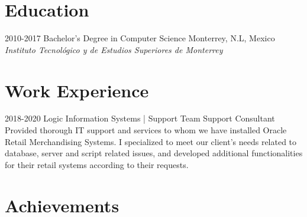 \documentclass[]{twentysecondcv}
\begin{document}
\section{Education}

\begin{twenty}
  \twentyitem
    {2010-2017}
    {Bachelor's Degree {\normalfont in Computer Science}}
    {Monterrey, N.L, Mexico}
    {\emph{Instituto Tecnológico y de Estudios Superiores de Monterrey}}
\end{twenty}


\section{Work Experience}

\begin{twenty}
  \twentyitem
    {2018-2020}
    {Logic Information Systems | Support Team}
    {Support Consultant}
    {Provided thorough IT support and services to whom we have installed Oracle Retail Merchandising Systems. I specialized to meet our client's needs related to database, server and script related issues, and developed additional functionalities for their retail systems according to their requests.}
\end{twenty}



\section{Achievements}
\end{document}

